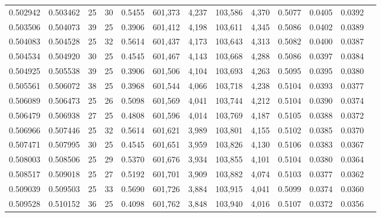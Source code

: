 \begin{tabular}{rrrrrrrrrrrrr}
0.502942 & 0.503462 &    25 &  30 &                                     0.5455 & 601,373 &   4,237 & 103,586 &   4,370 & 0.5077 & 0.0405 & 0.0392 \\
0.503506 & 0.504073 &    39 &  25 &                                     0.3906 & 601,412 &   4,198 & 103,611 &   4,345 & 0.5086 & 0.0402 & 0.0389 \\
0.504083 & 0.504528 &    25 &  32 &                                     0.5614 & 601,437 &   4,173 & 103,643 &   4,313 & 0.5082 & 0.0400 & 0.0387 \\
0.504534 & 0.504920 &    30 &  25 &                                     0.4545 & 601,467 &   4,143 & 103,668 &   4,288 & 0.5086 & 0.0397 & 0.0384 \\
0.504925 & 0.505538 &    39 &  25 &                                     0.3906 & 601,506 &   4,104 & 103,693 &   4,263 & 0.5095 & 0.0395 & 0.0380 \\
0.505561 & 0.506072 &    38 &  25 &                                     0.3968 & 601,544 &   4,066 & 103,718 &   4,238 & 0.5104 & 0.0393 & 0.0377 \\
0.506089 & 0.506473 &    25 &  26 &                                     0.5098 & 601,569 &   4,041 & 103,744 &   4,212 & 0.5104 & 0.0390 & 0.0374 \\
0.506479 & 0.506938 &    27 &  25 &                                     0.4808 & 601,596 &   4,014 & 103,769 &   4,187 & 0.5105 & 0.0388 & 0.0372 \\
0.506966 & 0.507446 &    25 &  32 &                                     0.5614 & 601,621 &   3,989 & 103,801 &   4,155 & 0.5102 & 0.0385 & 0.0370 \\
0.507471 & 0.507995 &    30 &  25 &                                     0.4545 & 601,651 &   3,959 & 103,826 &   4,130 & 0.5106 & 0.0383 & 0.0367 \\
0.508003 & 0.508506 &    25 &  29 &                                     0.5370 & 601,676 &   3,934 & 103,855 &   4,101 & 0.5104 & 0.0380 & 0.0364 \\
0.508517 & 0.509018 &    25 &  27 &                                     0.5192 & 601,701 &   3,909 & 103,882 &   4,074 & 0.5103 & 0.0377 & 0.0362 \\
0.509039 & 0.509503 &    25 &  33 &                                     0.5690 & 601,726 &   3,884 & 103,915 &   4,041 & 0.5099 & 0.0374 & 0.0360 \\
0.509528 & 0.510152 &    36 &  25 &                                     0.4098 & 601,762 &   3,848 & 103,940 &   4,016 & 0.5107 & 0.0372 & 0.0356 \\

\end{tabular}
